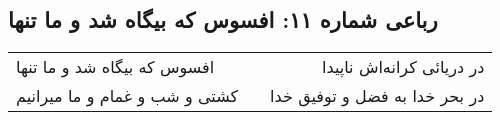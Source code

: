 \begin{center}
\section*{رباعی شماره ۱۱: افسوس که بیگاه شد و ما تنها}
\label{sec:0011}
\begin{longtable}{l p{0.5cm} r}
افسوس که بیگاه شد و ما تنها
&&
در دریائی کرانه‌اش ناپیدا
\\
کشتی و شب و غمام و ما میرانیم
&&
در بحر خدا به فضل و توفیق خدا
\\
\end{longtable}
\end{center}
